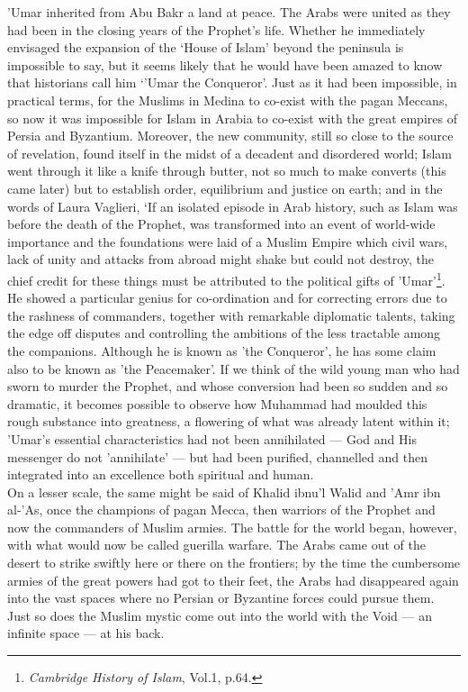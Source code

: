 \documentclass[10pt, twoside,openright]{book}
\begin{document}
'Umar inherited from Abu Bakr a land at peace. The Arabs were united as they had been in the closing years of the Prophet's life. Whether he immediately envisaged the expansion of the `House of Islam' beyond the peninsula is impossible to say, but it seems likely that he would have been amazed to know that historians call him `'Umar the Conqueror'. Just as it had been impossible, in practical terms, for the Muslims in Medina to co\hyp{}exist with the pagan Meccans, so now it was impossible for Islam in Arabia to co\hyp{}exist with the great empires of Persia and Byzantium. Moreover, the new community, still so close to the source of revelation, found itself in the midst of a decadent and disordered world; Islam went through it like a knife through butter, not so much to make converts (this came later) but to establish order, equilibrium and justice on earth; and in the words of Laura Vaglieri, `If an isolated episode in Arab history, such as Islam was before the death of the Prophet, was transformed into an event of world\hyp{}wide importance and the foundations were laid of a Muslim Empire which civil wars, lack of unity and attacks from abroad might shake but could not destroy, the chief credit for these things must be attributed to the political gifts of 'Umar'\footnote{\emph{Cambridge History of Islam}, Vol.1, p.64.}. \\

He showed a particular genius for co-ordination and for correcting errors due to the rashness of commanders, together with remarkable diplomatic talents, taking the edge off disputes and controlling the ambitions of the less tractable among the companions. Although he is known as 'the Conqueror', he has some claim also to be known as 'the Peacemaker'. If we think of the wild young man who had sworn to murder the Prophet, and whose conversion had been so sudden and so dramatic, it becomes possible to observe how Muhammad had moulded this rough substance into greatness, a flowering of what was already latent within it; 'Umar's essential characteristics had not been annihilated --- God and His messenger do not 'annihilate' --- but had been purified, channelled and then integrated into an excellence both spiritual and human. \\

On a lesser scale, the same might be said of Khalid ibnu'l Walid and 'Amr ibn al\hyp{}'As, once the champions of pagan Mecca, then warriors of the Prophet and now the commanders of Muslim armies. The battle for the world began, however, with what would now be called guerilla warfare. The Arabs came out of the desert to strike swiftly here or there on the frontiers; by the time the cumbersome armies of the great powers had got to their feet, the Arabs had disappeared again into the vast spaces where no Persian or Byzantine forces could pursue them. Just so does the Muslim mystic come out into the world with the Void --- an infinite space --- at his back. \\
\end{document}
